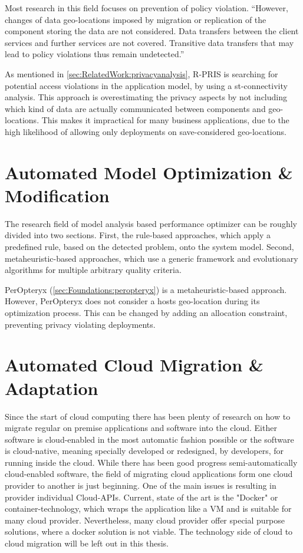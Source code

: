 Most research in this field focuses on prevention of policy violation. “However, changes of data geo-locations imposed by migration or replication of the component storing the data are not considered. Data transfers between the client services and further services are not covered. Transitive data transfers that may lead to policy violations thus remain undetected.”\cite{Schmieders.2015}

As mentioned in \autoref{sec:RelatedWork:privacyanalysis}, R-PRIS is searching for potential access violations in the application model, by using a st-connectivity analysis.\cite{Schmieders.2015}\cite{Schmieders.} This approach is overestimating the privacy aspects by not including which kind of data are actually communicated between components and geo-locations. This makes it impractical for many business applications, due to the high likelihood of allowing only deployments on save-considered geo-locations.


\section{Automated Model Optimization \& Modification}
\label{sec:RelatedWork:auto_model_opt}

The research field of model analysis based performance optimizer can be roughly divided into two sections. First, the rule-based approaches, which apply a predefined rule, based on the detected problem, onto the system model. Second, metaheuristic-based approaches, which use a generic framework and evolutionary algorithms for multiple arbitrary quality criteria.\cite{Martens.2010}

PerOpteryx (\autoref{sec:Foundations:peropteryx}) is a metaheuristic-based approach. However, PerOpteryx does not consider a hosts geo-location during its optimization process. This can be changed by adding an allocation constraint, preventing privacy violating deployments. 



\section{Automated Cloud Migration \& Adaptation}
\label{sec:RelatedWork:cloud_migration}

Since the start of cloud computing there has been plenty of research on how to migrate regular on premise applications and software into the cloud. Either software is cloud-enabled in the most automatic fashion possible or the software is cloud-native, meaning specially developed or redesigned, by developers, for running inside the cloud. While there has been good progress semi-automatically cloud-enabled software, the field of migrating cloud applications form one cloud provider to another is just beginning. One of the main issues is resulting in provider individual Cloud-APIs. Current, state of the art is the "Docker" or container-technology, which wraps the application like a VM and is suitable for many cloud provider. Nevertheless, many cloud provider offer special purpose solutions, where a docker solution is not viable. The technology side of cloud to cloud migration will be left out in this thesis. \cite{Jambunathan.February2016}\cite{Binz.2014} 